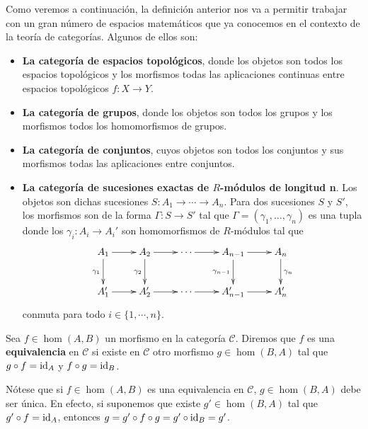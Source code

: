 \begin{ejemplo}
	Como veremos a continuación, la definición anterior nos va a permitir trabajar
	con un gran número de espacios matemáticos que ya conocemos en el contexto de
	la teoría de categorías. Algunos de ellos son:
	\begin{itemize}
		\item \textbf{La categoría de espacios topológicos}, donde los objetos son todos
			los espacios topológicos y los morfismos todas las aplicaciones continuas entre
			espacios topológicos \(f: X \rightarrow Y\).
		\item \textbf{La categoría de grupos}, donde los objetos son todos los grupos
			y los morfismos todos los homomorfismos de grupos.
		\item \textbf{La categoría de conjuntos}, cuyos objetos son todos los conjuntos
			y sus morfismos todas las aplicaciones entre conjuntos.
		\item \textbf{La categoría de sucesiones exactas de \(R\)-módulos de longitud
			n}. Los objetos son dichas sucesiones \(S: A_{1} \rightarrow \cdots \rightarrow
			A_{n}\). Para dos sucesiones \(S\) y \(S'\), los morfismos son de la forma \(\Gamma
			: S \rightarrow S'\) tal que \(\Gamma = (\gamma_{1}, \ldots, \gamma_{n})\) es una
			tupla donde los \(\gamma_{i}: A_{i} \rightarrow A_{i}'\) son homomorfismos de
			\(R\)-módulos tal que
			\begin{equation}
				\label{exactseqcat}\xymatrix{ A_1 \ar[r] \ar[d]_{\gamma_1} & A_2 \ar[r] \ar[d]_{\gamma_2} & \cdots \ar[r] & A_{n-1} \ar[r] \ar[d]_{\gamma_{n-1}} & A_n \ar[d]^{\gamma_n} \\ A'_1 \ar[r] & A'_2 \ar[r] & \cdots \ar[r] & A'_{n-1} \ar[r] & A'_n }
			\end{equation}
			conmuta para todo \(i \in \{ 1, \cdots, n \}\).
	\end{itemize}
\end{ejemplo}

\begin{definicion}
	Sea \(f \in \hom(A,B)\) un morfismo en la categoría \(\mathcal{C}\). Diremos que
	\(f\) es una \textbf{equivalencia} en \(\mathcal{C}\) si existe en \(\mathcal{C}\) otro
	morfismo \(g \in \hom(B,A)\) tal que \(g \circ f = \operatorname{id}_{A}\) y \(f \circ g = \operatorname{id}_{B}\).
\end{definicion}

Nótese que si \(f \in \hom(A,B)\) es una equivalencia en \(\mathcal{C}\),
\(g \in \hom(B,A)\) debe ser única. En efecto, si suponemos que existe
\(g' \in \hom(B,A)\) tal que \(g' \circ f = \operatorname{id}_{A}\), entonces \(g = g'\circ f \circ
g = g' \circ \operatorname{id}_{B} = g'\).

